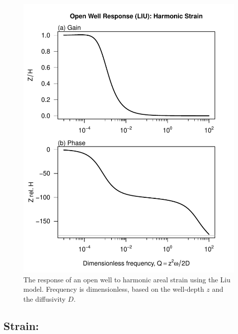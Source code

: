 \documentclass[12pt]{article}\usepackage[]{graphicx}\usepackage[]{color}
\makeatletter
\def\maxwidth{ %
  \ifdim\Gin@nat@width>\linewidth
    \linewidth
  \else
    \Gin@nat@width
  \fi
}
\newenvironment{knitrout}{}{} %
\makeatother
\begin{document}
\begin{figure}[htb!]
\begin{center}
\begin{knitrout}\small
{}\color{fgcolor}
\includegraphics[width=\maxwidth]{figure/LIURESPFIG} 

\end{knitrout}

\caption{The response of an open well to harmonic areal strain using
the Liu model. 
Frequency is dimensionless, based on the well-depth $z$ and the diffusivity $D$.
}
\label{fig:owrsp-liu}
\end{center}
\end{figure}

\clearpage
\subsection{Strain: \citet{rojstaczer1988}}
\end{document}
